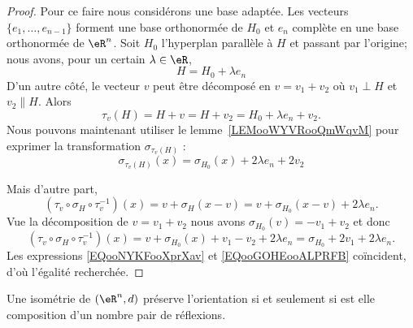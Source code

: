 \begin{proof}
    Pour ce faire nous considérons une base adaptée. Les vecteurs \( \{ e_1,\ldots, e_{n-1} \}\) forment une base orthonormée de \( H_0\) et \( e_n\) complète en une base orthonormée de \( \eR^n\). Soit \( H_0\) l'hyperplan parallèle à \( H\) et passant par l'origine; nous avons, pour un certain \( \lambda\in \eR\),
    \begin{equation}
        H=H_0+\lambda e_n
    \end{equation}
    D'un autre côté, le vecteur \( v\) peut être décomposé en \( v=v_1+v_2\) où \( v_1\perp H\) et \( v_2\parallel H\). Alors
    \begin{equation}
        \tau_v(H)=H+v=H+v_2=H_0+\lambda e_n+v_2.
    \end{equation}
    Nous pouvons maintenant utiliser le lemme~\ref{LEMooWYVRooQmWqvM} pour exprimer la transformation \( \sigma_{\tau_v(H)}\) :
    \begin{equation}        \label{EQooNYKFooXprXav}
        \sigma_{\tau_v(H)}(x)=\sigma_{H_0}(x)+ 2\lambda e_n+2v_2
    \end{equation}

    Mais d'autre part,
    \begin{equation}
        (\tau_v\circ \sigma_H\circ\tau_{v}^{-1})(x)=v+\sigma_H(x-v)=v+\sigma_{H_0}(x-v)+2\lambda e_n.
    \end{equation}
    Vue la décomposition de \( v=v_1+v_2\) nous avons \( \sigma_{H_0}(v)=-v_1+v_2\) et donc
    \begin{equation}        \label{EQooGOHEooALPRFB}
        (\tau_v\circ \sigma_H\circ\tau_{v}^{-1})(x)= v+  \sigma_{H_0}(x)+v_1-v_2+2\lambda e_n=\sigma_{H_0}+2v_1+2\lambda e_n.
    \end{equation}
    Les expressions \eqref{EQooNYKFooXprXav} et \eqref{EQooGOHEooALPRFB} coïncident, d'où l'égalité recherchée.
\end{proof}

\begin{theorem}      \label{THOooWBIYooCtWoSq}
    Une isométrie de \( (\eR^n,d)\) préserve l'orientation si et seulement si est elle composition d'un nombre pair de réflexions.
\end{theorem}

